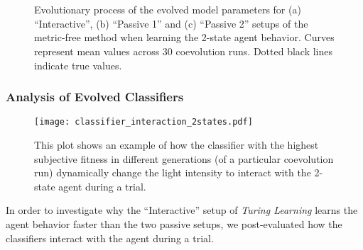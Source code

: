 \begin{figure}[!t]%
	\centering
		\\
		\\
		\caption{Evolutionary process of the evolved model parameters for (a) ``Interactive'', (b) ``Passive 1'' and (c) ``Passive 2'' setups of the metric-free method when learning the 2-state agent behavior. Curves represent mean values across 30 coevolution runs. Dotted black lines indicate true values.\label{fig:model_parameters_convergence_stochastic_2states}}
\end{figure}

\subsubsection{Analysis of Evolved Classifiers}
%
\begin{figure}[!t]
\centering
\texttt{[image: classifier\_interaction\_2states.pdf]}
\caption{This plot shows an example of how the classifier with the highest subjective fitness in different generations (of a particular coevolution run) dynamically change the light intensity to interact with the 2-state agent during a trial.}
\label{fig:classifier_interaction_2states}
\end{figure}
%
In order to investigate why the ``Interactive'' setup of \textit{Turing Learning} learns the agent behavior faster than the two passive setups, we post-evaluated how the classifiers interact with the agent during a trial. 

